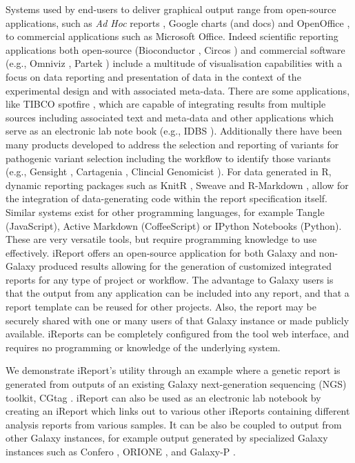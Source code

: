 Systems used by end-users to deliver graphical output range from open-source applications, such as \emph{Ad Hoc} reports \cite{url-adhoc}, Google charts (and docs) \cite{url-googlecharts} and OpenOffice \cite{url-openoffice}, to commercial applications such as Microsoft Office.
Indeed scientific reporting applications both open-source (Bioconductor \cite{url-bioconductor}, Circos \cite{circos}\cite{url-circos}) and commercial software (e.g., Omniviz \cite{url-omniviz}, Partek \cite{url-partek}) include a multitude of visualisation capabilities with a focus on data reporting and presentation of data in the context of the experimental design and with associated meta-data.
There are some applications, like TIBCO spotfire \cite{url-spotfire}, which are capable of integrating results from multiple sources including associated text and meta-data and other applications which serve as an electronic lab note book (e.g., IDBS \cite{url-idbs}).
Additionally there have been many products developed to address the selection and reporting of variants for pathogenic variant selection including the workflow to identify those variants (e.g., Gensight \cite{url-gensight}, Cartagenia \cite{url-cartagenia}, Clincial Genomicist \cite{clinicalgenomist}).
For data generated in R, dynamic reporting packages such as KnitR \cite{url-knitr}, Sweave \cite{sweave} and R-Markdown \cite{url-rmarkdown}, allow for the integration of data-generating code within the report specification itself. Similar systems exist for other programming languages, for example Tangle \cite{url-tangle} (JavaScript), Active Markdown \cite{url-activemarkdown}(CoffeeScript) or IPython Notebooks \cite{url-ipythonnotebook} (Python).
These are very versatile tools, but require programming knowledge to use effectively. iReport offers an open-source application for both Galaxy and non-Galaxy produced results allowing for the generation of customized integrated reports for any type of project or workflow.
The advantage to Galaxy users is that the output from any application can be included into any report, and that a report template can be reused for other projects.
Also, the report may be securely shared with one or many users of that Galaxy instance or made publicly available. iReports can be completely configured from the tool web interface, and requires no programming or knowledge of the underlying system.

We demonstrate iReport’s utility through an example where a genetic report is generated from outputs of an existing Galaxy next-generation sequencing (NGS) toolkit, CGtag \cite{cgtag}. iReport can also be used as an electronic lab notebook by creating an iReport which links out to various other iReports containing different analysis reports from various samples. It can be also be coupled to output from other Galaxy instances, for example output generated by specialized Galaxy instances such as Confero \cite{confero}, ORIONE \cite{orione}, and Galaxy-P \cite{url-galaxyp}.

